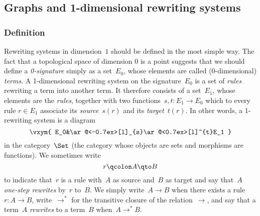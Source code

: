 \documentclass{LMCS}
\begin{document}
\subsection{Graphs and 1-dimensional rewriting systems}
\subsubsection{Definition}
Rewriting systems in dimension~$1$ should be defined in the most simple way. The
fact that a topological space of dimension 0 is a point suggests that we should
define a \emph{0-signature} simply as a set~$E_0$, whose elements are called
(0-dimensional) \emph{terms}. A 1-dimensional rewriting system on the
signature~$E_0$ is a set of \emph{rules} rewriting a term into another term. It
therefore consists of a set~$E_1$, whose elements are the \emph{rules}, together
with two functions~$s,t:E_1\to E_0$ which to every rule $r\in E_1$ associate its
\emph{source}~$s(r)$ and its \emph{target}~$t(r)$. In other words, a 1-rewriting
system is a diagram
\begin{equation}
  \label{eq:rs-1}
  \vxym{
    E_0&\ar@<-0.7ex>[l]_{s}\ar@<0.7ex>[l]^{t}E_1
  }
\end{equation}
in the category~$\Set$ (the category whose objects are sets and morphisms are
functions). We sometimes write
\[
r\qcolon A\qto B
\]
to indicate that~$r$ is a rule with~$A$ as source and~$B$ as target and say
that~$A$ \emph{one-step rewrites} by~$r$ to~$B$. We simply write~$A\to B$ when
there exists a rule $r:A\to B$, write~$\to^*$ for the transitive closure of the
relation~$\to$, and say that a term~$A$ \emph{rewrites} to a term~$B$
when~$A\to^*B$.
\end{document}
